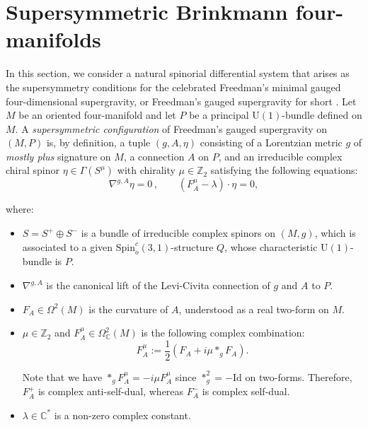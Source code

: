 \documentclass[10pt,a4paper,twoside,reqno]{amsart}
\theoremstyle{plain}
\theoremstyle{definition}
\theoremstyle{remark}
\def\Z{\mathbb{Z}}
\def\C{\mathbb{C}}
\def\Id{\mathrm{Id}}
\def\Spin{\mathrm{Spin}}
\def\Spin{\mathrm{Spin}}
\def\U{\mathrm{U}}
\begin{document}
\section{Supersymmetric Brinkmann four-manifolds}
\label{sec:sugraspinors}


In this section, we consider a natural spinorial differential system that arises as the supersymmetry conditions for the celebrated Freedman's minimal gauged four-dimensional supergravity, or Freedman's gauged supergravity for short \cite{Freedman_1977}. Let $M$ be an oriented four-manifold and let $P$ be a principal $\U(1)$-bundle defined on $M$. A \emph{supersymmetric configuration} of Freedman's gauged supergravity on $(M,P)$ is, by definition, a tuple $(g,A,\eta)$ consisting of a Lorentzian metric $g$ of \emph{mostly plus} signature on $M$, a connection $A$ on $P$, and an irreducible complex chiral spinor $\eta\in\Gamma(S^\mu)$ with chirality $\mu\in\Z_2$ satisfying the following equations:
\begin{equation}
\label{eq:susytrans}
\nabla^{g,A} \eta = 0\, , \qquad (F^{\mu}_A -  \lambda) \cdot \eta = 0,
\end{equation}

\noindent
where:
\begin{itemize}
\item $S = S^{+}\oplus S^{-}$ is a bundle of irreducible complex spinors on $(M,g)$, which is associated to a given $\Spin^c_o(3,1)$-structure $Q$, whose characteristic $\U(1)$-bundle is $P$.
\item $\nabla^{g,A}$ is the canonical lift of the Levi-Civita connection of $g$ and $A$ to $P$.
\item $F_A\in \Omega^2(M)$ is the curvature of $A$, understood as a real two-form on $M$.
\item  $\mu \in \mathbb{Z}_2$ and $F_A^{\mu} \in \Omega^2_\C(M)$ is the following complex combination:
\begin{equation*}
F_A^{\mu} := \frac{1}{2}(F_A + i \mu\ast_g F_A).
\end{equation*}

\noindent
Note that we have $\ast_g F_A^{\mu} = - i\mu F_A^{\mu}$ since $\ast_g^2 = -\Id$ on two-forms. Therefore, $F_A^{+}$ is complex anti-self-dual, whereas $F_A^{-}$ is complex self-dual.
\item $\lambda\in \mathbb{C}^{\ast}$ is a non-zero complex constant.
\end{itemize}
\end{document}
